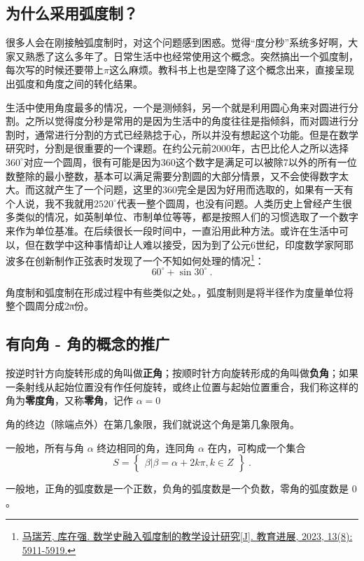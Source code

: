 \subsection{为什么采用弧度制？}

很多人会在刚接触弧度制时，对这个问题感到困惑。觉得“度分秒”系统多好啊，大家又熟悉了这么多年了。日常生活中也经常使用这个概念。突然搞出一个弧度制，每次写的时候还要带上$\pi$这么麻烦。教科书上也是空降了这个概念出来，直接呈现出弧度和角度之间的转化结果。

生活中使用角度最多的情况，一个是测倾斜，另一个就是利用圆心角来对圆进行分割。之所以觉得度分秒是常用的是因为生活中的角度往往是指倾斜，而对圆进行分割时，通常进行分割的方式已经熟捻于心，所以并没有想起这个功能。但是在数学研究时，分割是很重要的一个课题。在约公元前2000年，古巴比伦人之所以选择$360^\circ$对应一个圆周，很有可能是因为360这个数字是满足可以被除7以外的所有一位数整除的最小整数，基本可以满足需要分割圆的大部分情景，又不会使得数字太大。而这就产生了一个问题，这里的360完全是因为好用而选取的，如果有一天有个人说，我不我就用$2520^\circ$代表一整个圆周，也没有问题。人类历史上曾经产生很多类似的情况，如英制单位、市制单位等等，都是按照人们的习惯选取了一个数字来作为单位基准。在后续很长一段时间中，一直沿用此种方法。或许在生活中可以，但在数学中这种事情却让人难以接受，因为到了公元6世纪，印度数学家阿耶波多在创新制作正弦表时发现了一个不知如何处理的情况\footnote{\href{https://www.hanspub.org/journal/PaperInformation?paperID=71063&utm_source=chatgpt.com}{马瑞芳, 库在强. 数学史融入弧度制的教学设计研究[J]. 教育进展, 2023, 13(8): 5911-5919.}}：
\begin{equation}
60^\circ+\sin30^\circ~.
\end{equation}


角度制和弧度制在形成过程中有些类似之处。，弧度制则是将半径作为度量单位将整个圆周分成2π份。

\subsection{有向角 - 角的概念的推广}


按逆时针方向旋转形成的角叫做\textbf{正角}；按顺时针方向旋转形成的角叫做\textbf{负角}；如果一条射线从起始位置没有作任何旋转，或终止位置与起始位置重合，我们称这样的角为\textbf{零度角}，又称\textbf{零角}，记作 $\alpha = 0$

角的终边（除端点外）在第几象限，我们就说这个角是第几象限角。

一般地，所有与角 $\alpha$ 终边相同的角，连同角 $\alpha$ 在内，可构成一个集合
\begin{equation}
S = \begin{Bmatrix} \beta|\beta=\alpha+2k\pi,k \in Z \end{Bmatrix}~.
\end{equation}


一般地，正角的弧度数是一个正数，负角的弧度数是一个负数，零角的弧度数是 $0$。
